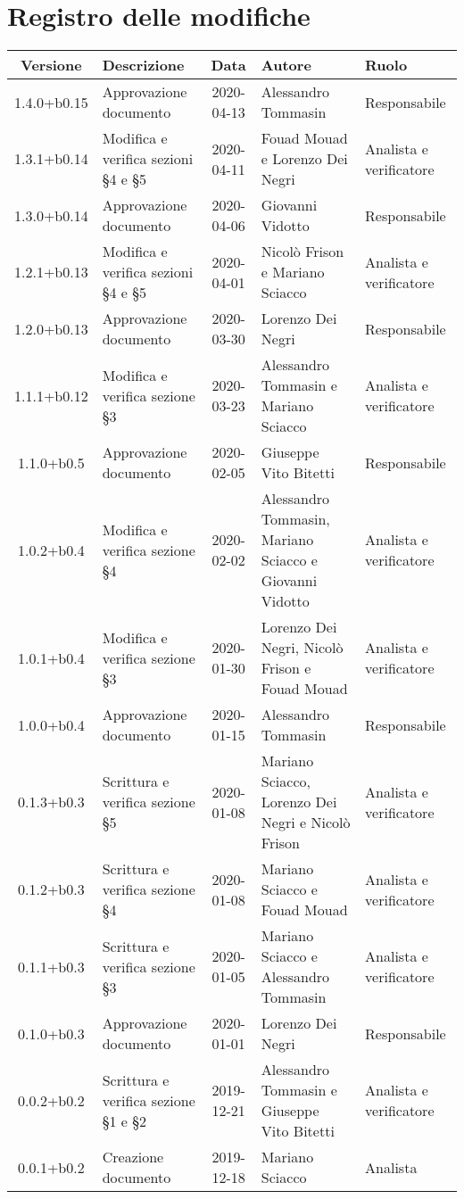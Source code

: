 \section*{Registro delle modifiche}

\begin{center}
	\begin{longtable}{|c|p{3.5cm}|c|p{3cm}|p{3cm}|}
	\hline
	\rowcolor{lighter-grayer}
	\textbf{Versione} & \textbf{Descrizione} & \textbf{Data} & \textbf{Autore} & \textbf{Ruolo} \\
	\hline
	\endfirsthead

	
	1.4.0+b0.15 & Approvazione documento & 2020-04-13 & Alessandro Tommasin & Responsabile \\
	\hline
	1.3.1+b0.14 & Modifica e verifica sezioni \S4 e \S5 & 2020-04-11 & Fouad Mouad e Lorenzo Dei Negri & Analista e verificatore \\
	\hline
	1.3.0+b0.14 & Approvazione documento & 2020-04-06 & Giovanni Vidotto & Responsabile \\
	\hline
	1.2.1+b0.13 & Modifica e verifica sezioni \S4 e \S5 & 2020-04-01 & Nicolò Frison e Mariano Sciacco & Analista e verificatore \\
	\hline
	1.2.0+b0.13 & Approvazione documento & 2020-03-30 & Lorenzo Dei Negri & Responsabile \\
	\hline
	1.1.1+b0.12 & Modifica e verifica sezione \S3 & 2020-03-23 & Alessandro Tommasin e Mariano Sciacco & Analista e verificatore \\
	\hline
	1.1.0+b0.5 & Approvazione documento & 2020-02-05 & Giuseppe Vito Bitetti & Responsabile \\
	\hline
	1.0.2+b0.4 & Modifica e verifica sezione \S4 & 2020-02-02 & Alessandro Tommasin, Mariano Sciacco e Giovanni Vidotto & Analista e verificatore \\
	\hline
	1.0.1+b0.4 & Modifica e verifica sezione \S3 & 2020-01-30 & Lorenzo Dei Negri, Nicolò Frison e Fouad Mouad & Analista e verificatore \\
	\hline
	1.0.0+b0.4 & Approvazione documento & 2020-01-15 & Alessandro Tommasin & Responsabile \\
	\hline
	0.1.3+b0.3 & Scrittura e verifica sezione \S5 & 2020-01-08 & Mariano Sciacco, Lorenzo Dei Negri e Nicolò Frison & Analista e verificatore \\
	\hline
	0.1.2+b0.3 & Scrittura e verifica sezione \S4 & 2020-01-08 & Mariano Sciacco e Fouad Mouad & Analista e verificatore \\
	\hline
	0.1.1+b0.3 & Scrittura e verifica sezione \S3 & 2020-01-05 & Mariano Sciacco e Alessandro Tommasin & Analista e verificatore \\
	\hline
	0.1.0+b0.3 & Approvazione documento & 2020-01-01 & Lorenzo Dei Negri & Responsabile \\
	\hline
	0.0.2+b0.2 & Scrittura e verifica sezione \S1 e \S2 & 2019-12-21 & Alessandro Tommasin e Giuseppe Vito Bitetti & Analista e verificatore \\
	\hline
	0.0.1+b0.2 & Creazione documento & 2019-12-18 & Mariano Sciacco & Analista \\
	\hline


\end{longtable}
\end{center}
